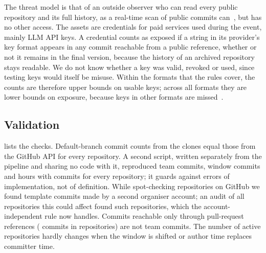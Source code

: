 \documentclass{article}
\begin{document}
The threat model is that of an outside observer who can read every public repository and its full history, as a real-time scan of public commits can~\cite{meli2019git}, but has no other access. The assets are credentials for paid services used during the event, mainly LLM API keys. A credential counts as exposed if a string in its provider's key format appears in any commit reachable from a public reference, whether or not it remains in the final version, because the history of an archived repository stays readable. We do not know whether a key was valid, revoked or used, since testing keys would itself be misuse. Within the formats that the rules cover, the counts are therefore upper bounds on usable keys; across all formats they are lower bounds on exposure, because keys in other formats are missed~\cite{basak2023tools}.

\subsection{Validation}
 lists the checks. Default-branch commit counts from the clones equal those from the GitHub API for every repository. A second script, written separately from the pipeline and sharing no code with it, reproduced team commits, window commits and hours with commits for every repository; it guards against errors of implementation, not of definition. While spot-checking repositories on GitHub we found template commits made by a second organiser account; an audit of all \NValidationTemplateAuditN{} repositories this could affect found \NValidationTemplateFixes{} such repositories, which the account-independent rule now handles. Commits reachable only through pull-request references (\NValidationPrOnlyCommits{} commits in \NValidationPrOnlyRepos{} repositories) are not team commits. The number of active repositories hardly changes when the window is shifted or author time replaces committer time.
\end{document}
